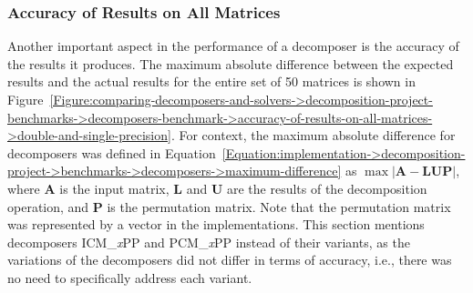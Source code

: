 \subsubsection{Accuracy of Results on All Matrices}\label{Subsection:comparing-decomposers-and-solvers->decomposition-project-benchmarks->decomposers-benchmark->accuracy-of-results-on-all-matrices}
Another important aspect in the performance of a decomposer is the accuracy of the results it produces.
The maximum absolute difference between the expected results and the actual results for the entire set of 50 matrices is shown in Figure~\ref{Figure:comparing-decomposers-and-solvers->decomposition-project-benchmarks->decomposers-benchmark->accuracy-of-results-on-all-matrices->double-and-single-precision}.
For context, the maximum absolute difference for decomposers was defined in Equation~\ref{Equation:implementation->decomposition-project->benchmarks->decomposers->maximum-difference} as $\max \left| \mathbf{A} - \mathbf{LUP} \right|$, where $\mathbf{A}$ is the input matrix, $\mathbf{L}$ and $\mathbf{U}$ are the results of the decomposition operation, and $\mathbf{P}$ is the permutation matrix.
Note that the permutation matrix was represented by a vector in the implementations.
This section mentions decomposers ICM\_\textit{x}PP and PCM\_\textit{x}PP instead of their variants, as the variations of the decomposers did not differ in terms of accuracy, i.e., there was no need to specifically address each variant.

